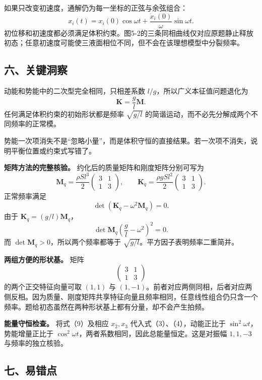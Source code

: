 \documentclass[12pt,a4paper,UTF8]{ctexart}
\begin{document}
如果只改变初速度，通解仍为每一坐标的正弦与余弦组合： \[
x_i(t)=x_i(0)\cos\omega t+\frac{\dot x_i(0)}\omega\sin\omega t.
\]
初位移和初速度都必须满足体积约束。图5-2的三条同相曲线仅对应原题静止释放初态；任意初速度可能使三液面相位不同，但不会在该理想模型中分裂频率。

\subsection{六、关键洞察}\label{ux516dux5173ux952eux6d1eux5bdf-4}

动能和势能中的二次型完全相同，只相差系数
\(l/g\)，所以广义本征值问题退化为 \[
\bm K=\frac gl\bm M.
\] 任何满足体积约束的初始形状都是频率 \(\sqrt{g/l}\)
的简谐运动，而不必先分解成两个不同频率的正常模。

势能一次项消失不是``忽略小量''，而是体积守恒的直接结果。若一次项不消失，说明平衡位置或约束式写错了。

\textbf{矩阵方法的完整核验。} 约化后的质量矩阵和刚度矩阵分别可写为 \[
\bm M_q=\frac{\rho Sl^3}{2}
\begin{pmatrix}3&1\\1&3\end{pmatrix},
\qquad
\bm K_q=\frac{\rho gSl^2}{2}
\begin{pmatrix}3&1\\1&3\end{pmatrix}.
\] 正常频率满足 \[
\det(\bm K_q-\omega^2\bm M_q)=0.
\] 由于 \(\bm K_q=(g/l)\bm M_q\)， \[
\det\bm M_q\left(\frac gl-\omega^2\right)^2=0.
\] 而 \(\det\bm M_q>0\)，所以两个频率都等于
\(\sqrt{g/l}\)。平方因子表明频率二重简并。

\textbf{两组方便的形状基。} 矩阵 \[
\begin{pmatrix}3&1\\1&3\end{pmatrix}
\] 的两个正交特征向量可取 \((1,1)\) 与
\((1,-1)\)。前者对应两侧同相，后者对应两侧反相。因为质量、刚度矩阵共享特征向量且频率相同，任意线性组合仍只含一个频率。题给初态虽然在两种形状基上都有分量，却不会产生拍频。

\textbf{能量守恒检查。} 将式（9）及相应 \(x_2,x_3\)
代入式（3）、（4），动能正比于 \(\sin^2\omega t\)，势能增量正比于
\(\cos^2\omega t\)，两者系数相同，因此总能量恒定。这是对振幅 \(1,1,-3\)
与频率的独立核验。

\subsection{七、易错点}\label{ux4e03ux6613ux9519ux70b9-4}
\end{document}
